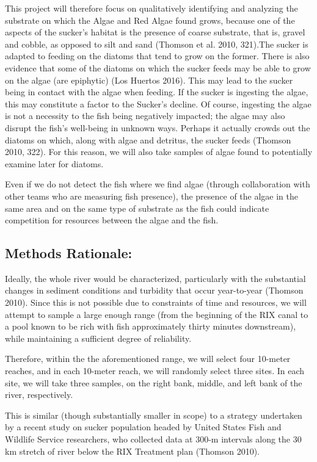 \documentclass{article}\usepackage[]{graphicx}\usepackage[]{color}
\begin{document}
This project will therefore focus on qualitatively identifying and analyzing the substrate on which the Algae and Red Algae found grows, because one of the aspects of the sucker’s habitat is the presence of coarse substrate, that is, gravel and cobble, as opposed to silt and sand (Thomson et al. 2010, 321).The sucker is adapted to feeding on the diatoms that tend to grow on the former. There is also evidence that some of the diatoms on which the sucker feeds may be able to grow on the algae (are epiphytic) (Los Huertos 2016). This may lead to the sucker being in contact with the algae when feeding. If the sucker is ingesting the algae, this may constitute a factor to the Sucker’s decline. Of course, ingesting the algae is not a necessity to the fish being negatively impacted; the algae may also disrupt the fish’s well-being in unknown ways. Perhaps it actually crowds out the diatoms on which, along with algae and detritus, the sucker feeds (Thomson 2010, 322). For this reason, we will also take samples of algae found to potentially examine later for diatoms.

Even if we do not detect the fish where we find algae (through collaboration with other teams who are measuring fish presence), the presence of the algae in the same area and on the same type of substrate as the fish could indicate competition for resources between the algae and the fish.

\subsection{Methods Rationale:}

Ideally, the whole river would be characterized, particularly with the substantial changes in sediment conditions and turbidity that occur year-to-year (Thomson 2010). Since this is not possible due to constraints of time and resources, we will attempt to sample a large enough range (from the beginning of the RIX canal to a pool known to be rich with fish approximately thirty minutes downstream), while maintaining a sufficient degree of reliability.

Therefore, within the the aforementioned range, we will select four 10-meter reaches, and in each 10-meter reach, we will randomly select three sites. In each site, we will take three samples, on the right bank, middle, and left bank of the river, respectively.

This is similar (though substantially smaller in scope) to a strategy undertaken by a recent study on sucker population headed by United States Fish and Wildlife Service researchers, who collected data at 300-m intervals along the 30 km stretch of river below the RIX Treatment plan (Thomson 2010). 
\end{document}
